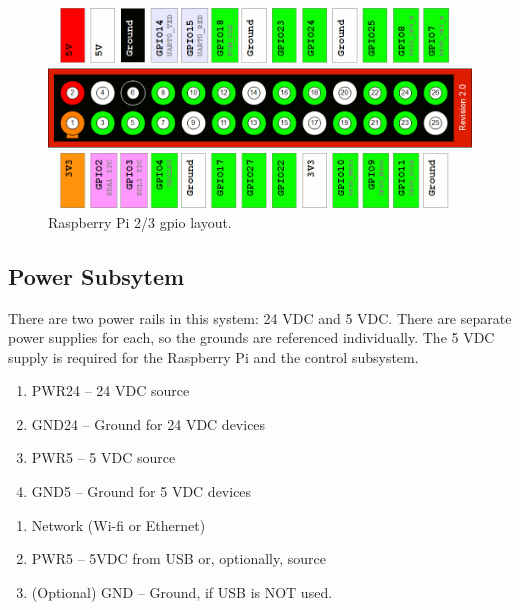\documentclass[twoside,a4paper]{refart}
\begin{document}
\begin{figure}[H]
	\centering
	\includegraphics[width=1.0\linewidth]{rpi2_gpio}
	\caption{Raspberry Pi 2/3 \gls{gpio} layout.}
	\label{fig:rpi2_gpio}
\end{figure}

\subsection{Power Subsytem}
There are two power rails in this system: 24 VDC and 5 VDC. There are separate power supplies for each, so the grounds are referenced individually. The 5 VDC supply is required for the Raspberry Pi and the control subsystem.
\begin{enumerate}
	\item  {} PWR24 -- 24 VDC source
	\item GND24 -- Ground for 24 VDC devices
	\item PWR5 -- 5 VDC source
	\item GND5 -- Ground for 5 VDC devices
\end{enumerate}
\begin{enumerate}
	\item  {} Network (Wi-fi or Ethernet)
	\item PWR5 -- 5VDC from USB or, optionally, source
	\item (Optional) GND -- Ground, if USB is NOT used. 
\end{enumerate}
\end{document}
